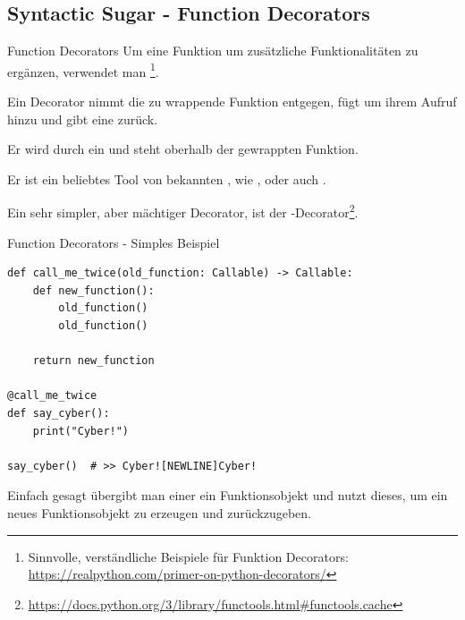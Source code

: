 \documentclass[12pt, aspectratio=169, usepdftitle=false]{beamer}
\newcommand{\pp}[1]{\lpl{#1}}
\newcommand{\furl}[1]{\footnote{\url{#1}}}
\begin{document}
\subsection{Syntactic Sugar - Function Decorators}
\begin{frame}{Function Decorators}
        Um eine Funktion um zusätzliche Funktionalitäten zu ergänzen, verwendet man\newline 
        \footnote{Sinnvolle, verständliche Beispiele für Funktion Decorators: \url{https://realpython.com/primer-on-python-decorators/}}.

		\medskip
		
		Ein Decorator nimmt die zu wrappende Funktion entgegen, fügt um ihrem Aufruf\newline
		  hinzu und gibt eine  zurück.
		
		\medskip
		
		Er wird durch ein \pp{@}  und steht oberhalb der gewrappten Funktion.
		
		\medskip
		
		Er ist ein beliebtes Tool von bekannten , wie ,  oder auch \pp{discord.py}.
		
		\medskip
		
		Ein sehr simpler, aber mächtiger Decorator, ist der \pp{@cache}-Decorator\furl{https://docs.python.org/3/library/functools.html\#functools.cache}.

\end{frame}


\begin{frame}{Function Decorators - Simples Beispiel}
	\begin{lstlisting}[language=pytiny]
def call_me_twice(old_function: Callable) -> Callable:
    def new_function():
        old_function()
        old_function()

    return new_function

@call_me_twice
def say_cyber():
    print("Cyber!")

say_cyber()  # >> Cyber![NEWLINE]Cyber!
	\end{lstlisting}
	
	Einfach gesagt übergibt man einer  ein Funktionsobjekt
	und nutzt dieses, um ein neues Funktionsobjekt zu erzeugen und zurückzugeben.
	
\end{frame}
\end{document}
